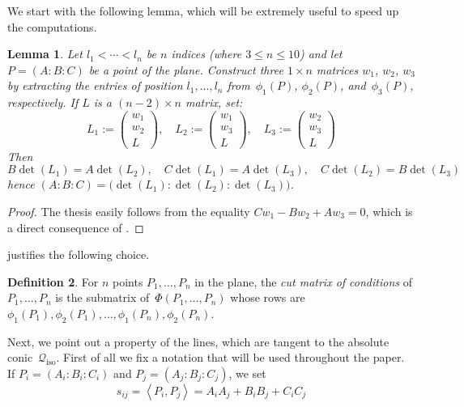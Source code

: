 \documentclass{amsart}
\theoremstyle{plain}
\newtheorem{lemma}{Lemma}[section]
\theoremstyle{definition}
\newtheorem{definition}[lemma]{Definition}
\newcommand{\iso}{\mathcal{Q}_{\mathrm{iso}}}
\newcommand{\scl}[2]{\left\langle {#1}, {#2} \right\rangle}
\begin{document}
We start with the following lemma, which will be extremely useful
to speed up the computations.

\begin{lemma}
\label{lemma:minors}
Let $l_1 < \cdots <l_n$ be $n$ indices (where $3 \leq n \leq 10$) and let $P = (A: B: C)$ be a point of the plane.
Construct three $1 \times n$ matrices $w_1$, $w_2$, $w_3$ by extracting the entries of position $l_1, \dotsc, l_n$ from~$\phi_1(P)$, $\phi_2(P)$, and~$\phi_3(P)$, respectively. If $L$ is a $(n-2) \times n$ matrix, set:
%
\[
  L_1 := \left( \begin{array}{c} w_1 \\ w_2 \\ L \end{array} \right), \quad
  L_2 := \left( \begin{array}{c} w_1 \\ w_3 \\ L \end{array} \right), \quad
  L_3 := \left( \begin{array}{c} w_2 \\ w_3 \\ L \end{array} \right)
\]
%
Then
%
\[
  B \det(L_1) = A \det(L_2), \quad
  C \det(L_1) = A \det(L_3), \quad
  C \det(L_2) = B \det(L_3)
\]
%
hence $(A: B: C) = \bigl( \det(L_1): \det(L_2): \det(L_3) \bigr)$.
\end{lemma}
\begin{proof}
The thesis easily follows from the equality $C w_1 - B w_2 + A w_3 = 0$, which is a direct consequence of .
\end{proof}

 justifies the following choice.

\begin{definition}
\label{definition:reduced_matrix_conditions}
For $n$ points $P_1, \dotsc, P_n$ in the plane, the \emph{cut matrix of conditions} of $P_1, \dotsc, P_n$ is the submatrix of~$\Phi(P_1, \dotsc, P_n)$ whose rows are $\phi_1(P_1), \phi_2(P_1), \dotsc, \phi_1(P_n), \phi_2(P_n)$.
\end{definition}

Next, we point out a property of the lines, which are tangent to the absolute conic~$\iso$.
First of all we fix a notation that will be used throughout the paper.
If $P_i = (A_i: B_i: C_i)$ and $P_j = (A_j: B_j: C_j)$, we set
%
\[
  s_{ij} = \scl{P_i}{P_j} = A_i A_j + B_i B_j + C_i C_j
\]
%
\end{document}
